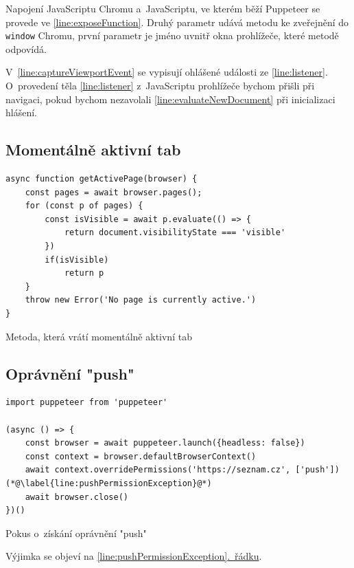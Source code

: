 \documentclass[12pt, a4paper, twoside]{article}
\newcommand{\codefigureSpacing}{1.2}
\newcommand{\refAddedText}[3]{\hyperref[#1]{#2\ref{#1}#3}}
\newcommand{\lineref}[2]{\refAddedText{#1}{}{.~#2}}
\begin{document}
	Napojení JavaScriptu Chromu a~JavaScriptu, ve kterém běží Puppeteer se provede ve \ref{line:exposeFunction}. Druhý parametr udává metodu ke zveřejnění do \texttt{window} Chromu, první parametr je jméno uvnitř okna prohlížeče, které metodě odpovídá. 
	
	V~\ref{line:captureViewportEvent} se vypisují ohlášené události ze \ref{line:listener}. O~provedení těla \ref{line:listener} z~JavaScriptu prohlížeče bychom přišli při navigaci, pokud bychom nezavolali \ref{line:evaluateNewDocument} při inicializaci hlášení.
	\subsection{Momentálně aktivní tab}
	\label{sub_sec:getActivePage}
	\begin{codefigure}[H]
		\renewcommand\baselinestretch{\codefigureSpacing}
		\begin{lstlisting}[style=MyJavaScript]
async function getActivePage(browser) {
	const pages = await browser.pages();
	for (const p of pages) {
		const isVisible = await p.evaluate(() => { 
			return document.visibilityState === 'visible' 
		})
		if(isVisible)
			return p
	}
	throw new Error('No page is currently active.')
}
		\end{lstlisting}
		\caption{Metoda, která vrátí momentálně aktivní tab}
	\end{codefigure}
	\subsection{Oprávnění "push"}
	\label{sub_sec:pushException}
	\begin{codefigure}[H]
		\renewcommand\baselinestretch{\codefigureSpacing}
		\begin{lstlisting}[style=MyJavaScript]
import puppeteer from 'puppeteer'

(async () => {
	const browser = await puppeteer.launch({headless: false})
	const context = browser.defaultBrowserContext()
	await context.overridePermissions('https://seznam.cz', ['push'])(*@\label{line:pushPermissionException}@*)
	await browser.close()
})()
		\end{lstlisting}
		\caption{Pokus o~získání oprávnění "push"}
	\end{codefigure}
	\noindent Výjimka se objeví na \lineref{line:pushPermissionException}{řádku}.
\end{document}
